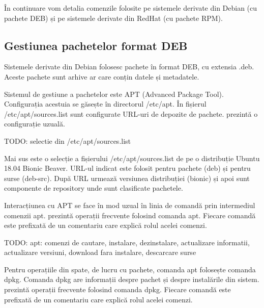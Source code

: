 În continuare vom detalia comenzile folosite pe sistemele derivate din Debian (cu pachete DEB) și pe sistemele derivate din RedHat (cu pachete RPM).

\subsection{Gestiunea pachetelor format DEB}
\label{sec:package:deb}

Sistemele derivate din Debian folosesc pachete în format DEB, cu extensia .deb. Aceste pachete sunt arhive ar care conțin datele și metadatele.

Sistemul de gestiune a pachetelor este APT (Advanced Package Tool). Configurația acestuia se găsește în directorul /etc/apt. În fișierul /etc/apt/sources.list sunt configurate URL-uri de depozite de pachete.  prezintă o configurație uzuală.

\begin{screen}[caption={Configurație APT (Debian)},label={lst:package:deb-config}]
TODO: selectie din /etc/apt/sources.list
\end{screen}

Mai sus este o selecție a fișierului /etc/apt/sources.list de pe o distribuție Ubuntu 18.04 Bionic Beaver. URL-ul indicat este folosit pentru pachete (deb) și pentru surse (deb-src). După URL urmează versiunea distribuției (bionic) și apoi sunt componente de repository unde sunt clasificate pachetele.

Interacțiunea cu APT se face în mod uzual în linia de comandă prin intermediul comenzii apt.  prezintă operații frecvente folosind comanda apt. Fiecare comandă este prefixată de un comentariu care explică rolul acelei comenzi.

\begin{screen}[caption={Operații frecvente cu apt},label={lst:package:apt}]
TODO: apt: comenzi de cautare, instalare, dezinstalare, actualizare informatii, actualizare versiuni, download fara instalare, descarcare surse
\end{screen}

Pentru operațiile din spate, de lucru cu pachete, comanda apt folosește comanda dpkg. Comanda dpkg are informații despre pachet și despre instalările din sistem.  prezintă operații frecvente folosind comanda dpkg. Fiecare comandă este prefixată de un comentariu care explică rolul acelei comenzi.

